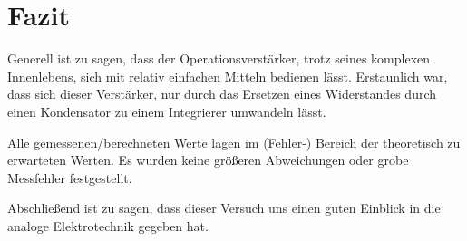 \chapter{Fazit}
Generell ist zu sagen, dass der Operationsverstärker, trotz seines komplexen Innenlebens, sich mit relativ einfachen Mitteln bedienen lässt.
Erstaunlich war, dass sich dieser Verstärker, nur durch das Ersetzen eines Widerstandes durch einen Kondensator zu einem Integrierer umwandeln lässt.

Alle gemessenen/berechneten Werte lagen im (Fehler-) Bereich der theoretisch zu erwarteten Werten.
Es wurden keine größeren Abweichungen oder grobe Messfehler festgestellt.

Abschließend ist zu sagen, dass dieser Versuch uns einen guten Einblick in die analoge Elektrotechnik gegeben hat.
